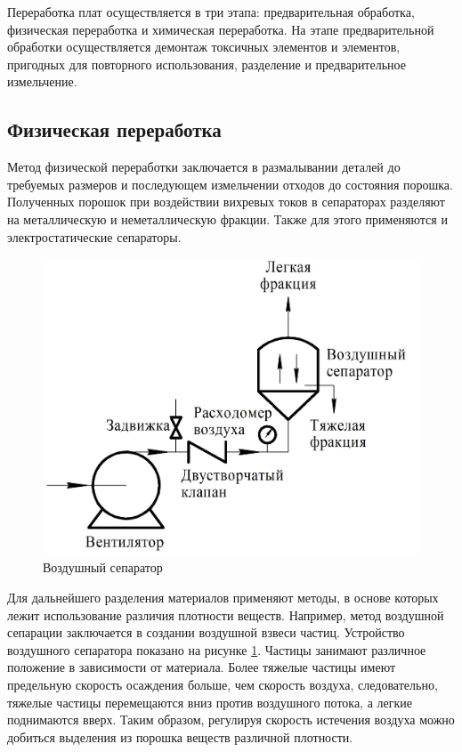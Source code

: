 \documentclass[14pt,oneside,final]{extreport}
\begin{document}
	Переработка плат осуществляется в три этапа: предварительная обработка, физическая переработка и химическая переработка. На этапе предварительной обработки осуществляется демонтаж токсичных элементов и элементов, пригодных для повторного использования, разделение и предварительное измельчение. 
	
	\subsection{Физическая переработка}
	Метод физической переработки заключается в размалывании деталей до требуемых размеров и последующем измельчении отходов до состояния порошка. Полученных порошок при воздействии вихревых токов в сепараторах разделяют на металлическую и неметаллическую фракции. Также для этого применяются и электростатические сепараторы. 
			\begin{figure}[!h]
				\begin{center}
					\includegraphics[scale=1.1]{img/air-separator} 
				\end{center}
				\caption{Воздушный сепаратор}
				\label{fig:air-separator}
			\end{figure}

	Для дальнейшего разделения материалов применяют методы, в основе которых лежит использование различия плотности веществ. Например, метод воздушной сепарации заключается в создании воздушной взвеси частиц. Устройство воздушного сепаратора показано на рисунке \ref{fig:air-separator}. Частицы занимают различное положение в зависимости от материала. Более тяжелые частицы имеют предельную скорость осаждения больше, чем скорость воздуха, следовательно, тяжелые частицы перемещаются вниз против воздушного потока, а легкие поднимаются вверх. Таким образом, регулируя скорость истечения воздуха можно добиться выделения из порошка веществ различной плотности.
		
\end{document}
